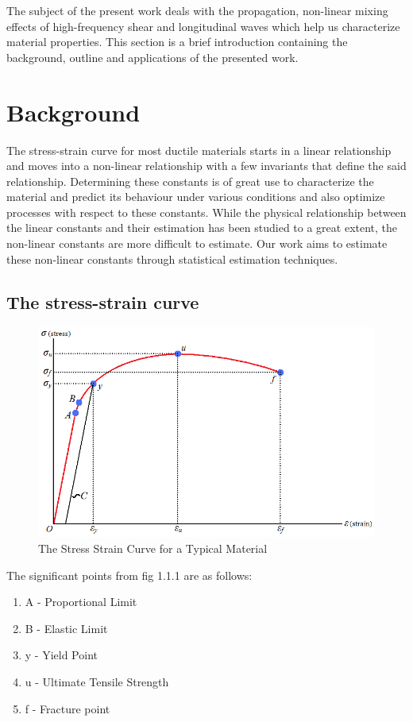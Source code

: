 The subject of the present work deals with the propagation, non-linear mixing effects of high-frequency shear and longitudinal waves which help us characterize material properties. This section is a brief introduction containing the background, outline and applications of the presented work.

\section{Background}
The stress-strain curve for most ductile materials starts in a linear relationship and moves into a non-linear relationship with a few invariants that define the said relationship. Determining these constants is of great use to characterize the material and predict its behaviour under various conditions and also optimize processes with respect to these constants. While the physical relationship between the linear constants and their estimation has been studied to a great extent, the non-linear constants are more difficult to estimate. Our work aims to estimate these non-linear constants through statistical estimation techniques.

\subsection{The stress-strain curve}
\begin{center}
\begin{figure}[ht]
\includegraphics[scale=0.45]{images/chapter_1/stressstrain.png}
\caption{The Stress Strain Curve for a Typical Material}
\end{figure}
\end{center}
The significant points from fig 1.1.1 are as follows:
\begin{enumerate}
\item A - Proportional Limit
\item B - Elastic Limit
\item y - Yield Point
\item u - Ultimate Tensile Strength
\item f - Fracture point
\end{enumerate}
